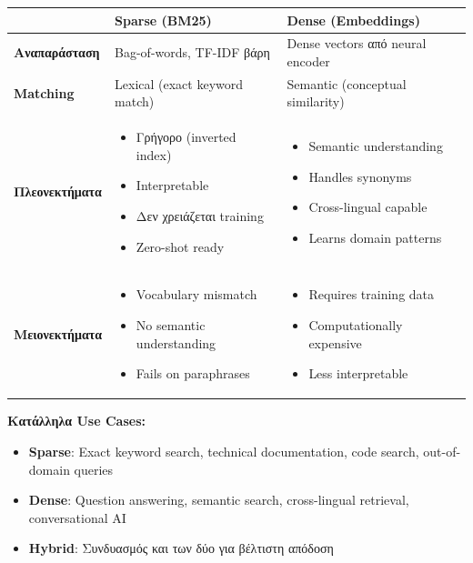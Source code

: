 \begin{center}
\begin{tabular}{p{3cm}p{5cm}p{5cm}}
\toprule
& \textbf{Sparse (BM25)} & \textbf{Dense (Embeddings)} \\
\midrule
\textbf{Αναπαράσταση} &
Bag-of-words, TF-IDF βάρη &
Dense vectors από neural encoder \\
\midrule
\textbf{Matching} &
Lexical (exact keyword match) &
Semantic (conceptual similarity) \\
\midrule
\textbf{Πλεονεκτήματα} &
\begin{itemize}[leftmargin=*, nosep]
    \item Γρήγορο (inverted index)
    \item Interpretable
    \item Δεν χρειάζεται training
    \item Zero-shot ready
\end{itemize} &
\begin{itemize}[leftmargin=*, nosep]
    \item Semantic understanding
    \item Handles synonyms
    \item Cross-lingual capable
    \item Learns domain patterns
\end{itemize} \\
\midrule
\textbf{Μειονεκτήματα} &
\begin{itemize}[leftmargin=*, nosep]
    \item Vocabulary mismatch
    \item No semantic understanding
    \item Fails on paraphrases
\end{itemize} &
\begin{itemize}[leftmargin=*, nosep]
    \item Requires training data
    \item Computationally expensive
    \item Less interpretable
\end{itemize} \\
\bottomrule
\end{tabular}
\end{center}

\textbf{Κατάλληλα Use Cases:}

\begin{itemize}
    \item \textbf{Sparse}: Exact keyword search, technical documentation, code search,
    out-of-domain queries

    \item \textbf{Dense}: Question answering, semantic search, cross-lingual retrieval,
    conversational AI

    \item \textbf{Hybrid}: Συνδυασμός και των δύο για βέλτιστη απόδοση
\end{itemize}

